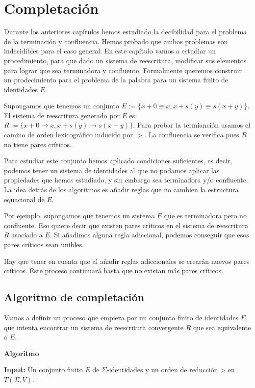\chapter{Completación}

Durante los anteriores capítulos hemos estudiado la decibilidad para
el problema de la terminación y confluencia. Hemos probado que ambos
problemas son indecidibles para el caso general. En este capítulo
vamos a estudiar un procedimiento, para que dado un sistema de
reescritura, modificar sus elementos para lograr que sea terminadora y
confluente. Formalmente queremos construir un prodecimiento para el
problema de la palabra para un sistema finito de identidades $E$.

Supongamos que tenemos un conjunto
$E := \{ x + 0 \equiv x, x + s(y) \equiv s(x+y) \}$. El sistema de
reescritura generado por $E$ es
$R := \{ x + 0 \rightarrow x, x + s(y) \rightarrow s(x+y)\}$.  Para
probar la termianción usamos el camino de orden lexicográfico inducido
por $>$. La confluencia se verifica pues $R$ no tiene pares críticos.

Para estudiar este conjunto hemos aplicado condiciones suficientes, es
decir, podemos tener un sistema de identidades al que no podamos
aplicar las propiedades que hemos estudiado, y sin embargo sea
terminadora y/o confluente. La idea detrás de los algorítmos es añadir
reglas que no cambien la estructura equacional de $E$.

Por ejemplo, supongamos que tenemos un sistema $E$ que es terminadora
pero no confluente. Eso quiere decir que existen pares críticos en el
sistema de reescritura $R$ asociado a $E$. Si añadimos alguna regla
adiccional, podemos conseguir que esos pares críticos sean unibles.

Hay que tener en cuenta que al añadir reglas adiccionales se crearán
nuevos pares críticos. Este proceso continuará hasta que no existan
más pares críticos.

\section{Algoritmo de completación}

Vamos a definir un proceso que empieza por un conjunto finito de
identidades $E$, que intenta encontrar un sistema de reescritura
convergente $R$ que sea equivalente a $E$.

\textbf{Algoritmo} \hrulefill

\textbf{Input:} Un conjunto finito $E$ de $\Sigma$-identidades y un
orden de reducción > en $T(\Sigma, V)$.

